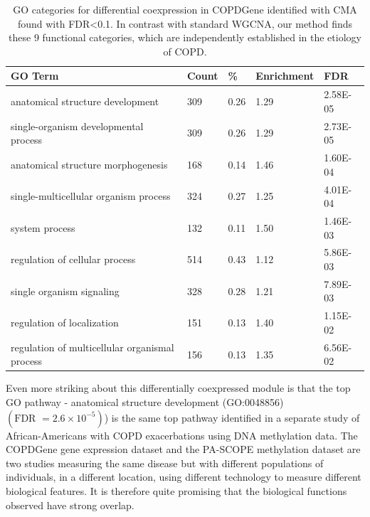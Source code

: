 \begin{table}
\centering
\begin{tabular}{@{}lllll@{}}
\toprule
GO Term                                                  & Count & \%   & Enrichment & FDR      \\ \midrule
anatomical structure development                         & 309   & 0.26 & 1.29       & 2.58E-05 \\
single-organism developmental process                    & 309   & 0.26 & 1.29       & 2.73E-05 \\
anatomical structure morphogenesis                       & 168   & 0.14 & 1.46       & 1.60E-04 \\
single-multicellular organism process                    & 324   & 0.27 & 1.25       & 4.01E-04 \\
system process                                           & 132   & 0.11 & 1.50       & 1.46E-03 \\
regulation of cellular process                           & 514   & 0.43 & 1.12       & 5.86E-03 \\
single organism signaling                                & 328   & 0.28 & 1.21       & 7.89E-03 \\
regulation of localization                               & 151   & 0.13 & 1.40       & 1.15E-02 \\
regulation of multicellular organismal process           & 156   & 0.13 & 1.35       & 6.56E-02 \\
\end{tabular}

\caption[GO enrichment results for COPDGene]{GO categories for differential coexpression in COPDGene identified with CMA found with FDR<0.1.  In contrast with standard WGCNA, our method finds these 9 functional categories, which are independently established in the etiology of COPD.}
\label{GO_table}
\end{table}

Even more striking about this differentially coexpressed module is that the top GO pathway - anatomical structure development (GO:0048856) $\left(\text{FDR }=2.6\times10^{-5}\right)$) is the same top pathway identified in a separate study of African-Americans with COPD exacerbations\cite{busch2016differential} using DNA methylation data.  The COPDGene gene expression dataset and the PA-SCOPE methylation dataset are two studies measuring the same disease but with different populations of individuals, in a different location, using different technology to measure different biological features.  It is therefore quite promising that the biological functions observed have strong overlap.


